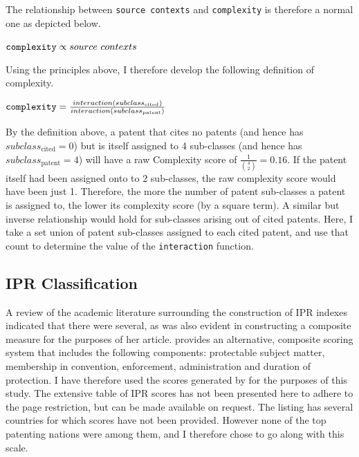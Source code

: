 \documentclass[12pt]{article}
\begin{document}
The relationship between \verb|source contexts| and \verb|complexity| is therefore a normal one as depicted below.
\begin{center}$ \verb|complexity| \propto source \ contexts $ \end{center} 

Using the principles above, I therefore develop the following definition of complexity.
\begin{center}$ \verb|complexity| = \frac{interaction(subclass_{\text{cited}})}{interaction(subclass_{\text{patent}})} $ \end{center}

By the definition above, a patent that cites no patents (and hence has $subclass_{\text{cited}} = 0$) but is itself assigned to 4 sub-classes (and hence has $subclass_{\text{patent}} = 4$) will have a raw Complexity score of $\frac{1}{\binom{4}{2}} = 0.16$. If the patent itself had been assigned onto to 2 sub-classes, the raw complexity score would have been just 1. Therefore, the more the number of patent sub-classes a patent is assigned to, the lower its complexity score (by a square term). A similar but inverse relationship would hold for sub-classes arising out of cited patents. Here, I take a set union of patent sub-classes assigned to each cited patent, and use that count to determine the value of the \verb|interaction| function.

\subsection{IPR Classification}
A review of the academic literature surrounding the construction of IPR indexes indicated that there were several, as was also evident in \cite{Zhao2006} constructing a composite measure for the purposes of her article. \cite{Lesser2010} provides an alternative, composite scoring system that includes the following components: protectable subject matter, membership in convention, enforcement, administration and duration of protection. I have therefore used the scores generated by \cite{Lesser2010} for the purposes of this study. The extensive table of IPR scores has not been presented here to adhere to the page restriction, but can be made available on request. The listing has several countries for which scores have not been provided. However none of the top patenting nations were among them, and I therefore chose to go along with this scale.%
\end{document}
